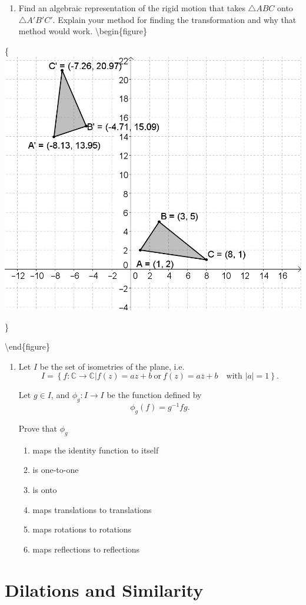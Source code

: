 \documentclass[
]{book}
\providecommand{\tightlist}{%
  \setlength{\itemsep}{0pt}\setlength{\parskip}{0pt}}
\theoremstyle{definition}
\theoremstyle{definition}
\theoremstyle{definition}
\theoremstyle{definition}
\theoremstyle{remark}
\begin{document}
\begin{enumerate}
\def\labelenumi{\arabic{enumi}.}
\tightlist
\item
  Find an algebraic representation of the rigid motion that takes \(\triangle ABC\) onto \(\triangle A'B'C'\). Explain your method for finding the transformation and why that method would work.
  \textbackslash begin\{figure\}
\end{enumerate}

\{\centering \includegraphics[width=0.35\linewidth]{images/Transformation_Triangles}

\}

\textbackslash end\{figure\}

\begin{enumerate}
\def\labelenumi{\arabic{enumi}.}
\item
  Let \(I\) be the set of isometries of the plane, i.e.~\[I= \left\{ f:\mathbb{C} \rightarrow \mathbb{C} | f(z)=az+b \: \mbox{or} \: f(z)=a\overline{z}+b \quad \mbox{with }  |a|=1 \right\}.\]

  Let \(g\in I\), and \(\phi_g : I \rightarrow I\) be the function defined by \[\phi_g (f) = g^{-1} f g.\]

  Prove that \(\phi_g\)

  \begin{enumerate}
  \def\labelenumii{\alph{enumii}.}
  \tightlist
  \item
    maps the identity function to itself
  \item
    is one-to-one
  \item
    is onto
  \item
    maps translations to translations
  \item
    maps rotations to rotations
  \item
    maps reflections to reflections
  \end{enumerate}
\end{enumerate}

\hypertarget{dilations-and-similarity}{%
\section{Dilations and Similarity}\label{dilations-and-similarity}}
\end{document}
